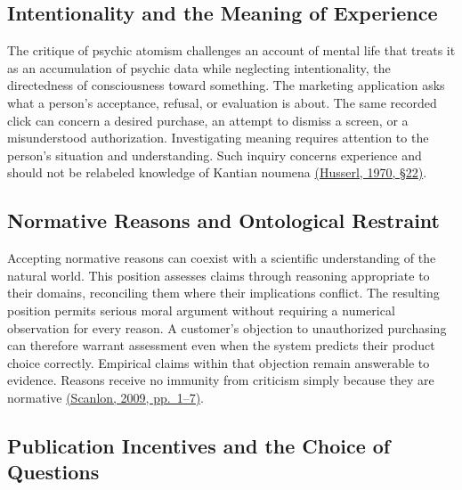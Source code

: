 \hypertarget{M09-intentionality-and-the-meaning-of-experience}{%
\subsection{Intentionality and the Meaning of
Experience}\label{M09-intentionality-and-the-meaning-of-experience}}

\noindent \noindent The critique of psychic atomism challenges an account of
mental life that treats it as an accumulation of psychic data while
neglecting intentionality, the directedness of consciousness toward
something. The marketing application asks what a person's acceptance,
refusal, or evaluation is about. The same recorded click can concern a
desired purchase, an attempt to dismiss a screen, or a misunderstood
authorization. Investigating meaning requires attention to the person's
situation and understanding. Such inquiry concerns experience and should
not be relabeled knowledge of Kantian noumena
\href{https://www.marxists.org/reference/subject/philosophy/works/ge/husserl.htm}{(Husserl,
1970, §22)}.

\hypertarget{M09-normative-reasons-and-ontological-restraint}{%
\subsection{Normative Reasons and Ontological
Restraint}\label{M09-normative-reasons-and-ontological-restraint}}

\noindent \noindent Accepting normative reasons can coexist with a scientific
understanding of the natural world. This position assesses claims
through reasoning appropriate to their domains, reconciling them where
their implications conflict. The resulting position permits serious
moral argument without requiring a numerical observation for every
reason. A customer's objection to unauthorized purchasing can therefore
warrant assessment even when the system predicts their product choice
correctly. Empirical claims within that objection remain answerable to
evidence. Reasons receive no immunity from criticism simply because they
are normative
\href{https://media.philosophy.ox.ac.uk/assets/pdf_file/0008/25856/Lecture_2.pdf}{(Scanlon,
2009, pp.~1--7)}.

\hypertarget{M09-publication-incentives-and-the-choice-of-questions}{%
\subsection{Publication Incentives and the Choice of
Questions}\label{M09-publication-incentives-and-the-choice-of-questions}}

